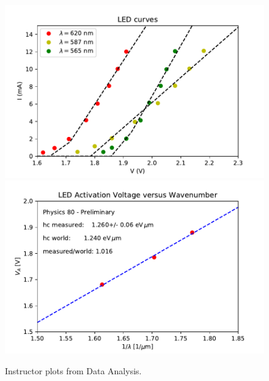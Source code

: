 \begin{figure}[htbp]
\begin{center}
\includegraphics[height=0.3\textheight]{figs/labs/planck/led_curves.pdf} \\
\includegraphics[height=0.3\textheight]{figs/labs/planck/planck.pdf} \\
\end{center}
\caption{Instructor plots from Data Analysis.}
\label{fig:planck_setup}
\end{figure}
